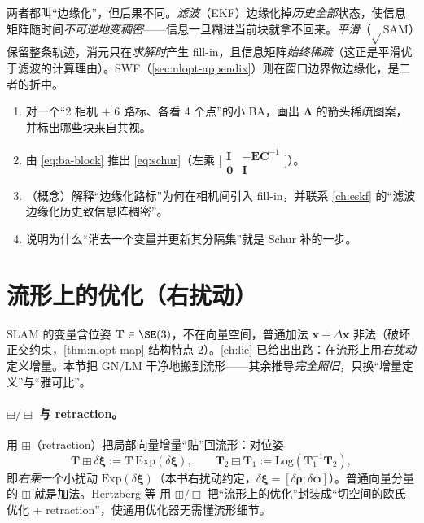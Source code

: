 \begin{pitfall}
两者都叫“边缘化”，但后果不同。\emph{滤波}（EKF）边缘化掉\emph{历史全部}状态，使信息矩阵随时间\emph{不可逆地变稠密}\cite{dellaert2017factor}——信息一旦糊进当前块就拿不回来。\emph{平滑}（$\sqrt{}$SAM）保留整条轨迹，消元只在\emph{求解时}产生 fill-in，且信息矩阵\emph{始终稀疏}（这正是平滑优于滤波的计算理由）。SWF（\cref{sec:nlopt-appendix}）则在窗口边界做边缘化，是二者的折中。
\end{pitfall}

\begin{practice}
\begin{enumerate}
  \item 对一个“2 相机 $+$ 6 路标、各看 4 个点”的小 BA，画出 $\boldsymbol{\Lambda}$ 的箭头稀疏图案，并标出哪些块来自共视。
  \item 由 \cref{eq:ba-block} 推出 \cref{eq:schur}（左乘 $\big[\begin{smallmatrix}\mathbf{I}&-\mathbf{E}\mathbf{C}^{-1}\\\mathbf{0}&\mathbf{I}\end{smallmatrix}\big]$）。
  \item （概念）解释“边缘化路标”为何在相机间引入 fill-in，并联系 \cref{ch:eskf} 的“滤波边缘化历史致信息阵稠密”。
  \item 说明为什么“消去一个变量并更新其分隔集”就是 Schur 补的一步。
\end{enumerate}
\end{practice}

\section{流形上的优化（右扰动）}
\label{sec:nlopt-manifold}

SLAM 的变量含位姿 $\mathbf{T}\in\SE(3)$，不在向量空间，普通加法 $\mathbf{x}+\Delta\mathbf{x}$ 非法（破坏正交约束，\cref{thm:nlopt-map} 结构特点 2）。\cref{ch:lie} 已给出出路：在流形上用\emph{右扰动}定义增量。本节把 GN/LM 干净地搬到流形——其余推导\emph{完全照旧}，只换“增量定义”与“雅可比”。

\paragraph{$\boxplus/\boxminus$ 与 retraction。}\cite{hertzberg2013integrating}
用 \emph{$\boxplus$}（retraction）把局部向量增量“贴”回流形：对位姿
\begin{equation}
  \mathbf{T}\boxplus\delta\boldsymbol{\xi}:=\mathbf{T}\,\mathrm{Exp}(\delta\boldsymbol{\xi}),\qquad
  \mathbf{T}_2\boxminus\mathbf{T}_1:=\mathrm{Log}(\mathbf{T}_1^{-1}\mathbf{T}_2),
  \label{eq:retraction}
\end{equation}
即\emph{右乘}一个小扰动 $\mathrm{Exp}(\delta\boldsymbol{\xi})$（本书右扰动约定，$\delta\boldsymbol{\xi}=[\delta\boldsymbol{\rho};\delta\boldsymbol{\phi}]$）。普通向量分量的 $\boxplus$ 就是加法。Hertzberg 等\cite{hertzberg2013integrating} 用 $\boxplus/\boxminus$ 把“流形上的优化”封装成“切空间的欧氏优化 $+$ retraction”，使通用优化器无需懂流形细节。

